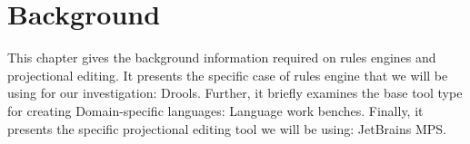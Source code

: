 \chapter{Background}\label{chapter:Background}

This chapter gives the background information required on rules engines and projectional editing.  
It presents the specific case of rules engine that we will be using for our investigation: Drools.
Further, it briefly examines the base tool type for creating Domain-specific languages: Language work benches. 
Finally, it presents the specific projectional editing tool we will be using: JetBrains MPS.



